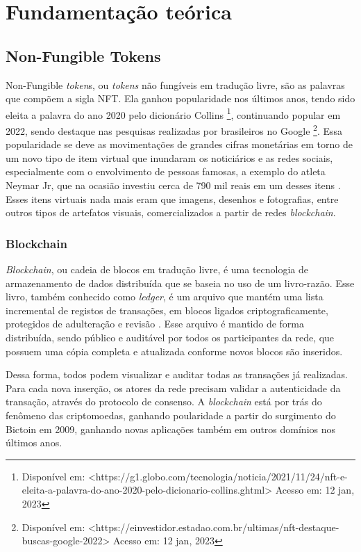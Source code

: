 \chapter{Fundamentação teórica}
\label{cap:fundamentacao-teorica}

\section{Non-Fungible Tokens}
\label{sec:non-fungible tokens}

Non-Fungible \textit{token}s, ou \textit{tokens} não fungíveis em tradução livre, são as palavras que compõem a sigla NFT. Ela ganhou popularidade nos últimos anos, tendo sido eleita a palavra do ano 2020 pelo dicionário Collins \footnote{Disponível em: <https://g1.globo.com/tecnologia/noticia/2021/11/24/nft-e-eleita-a-palavra-do-ano-2020-pelo-dicionario-collins.ghtml> Acesso em: 12 jan, 2023}, continuando popular em 2022, sendo destaque nas pesquisas realizadas por brasileiros no Google \footnote{Disponível em: <https://einvestidor.estadao.com.br/ultimas/nft-destaque-buscas-google-2022> Acesso em: 12 jan, 2023}. Essa popularidade se deve as movimentações de grandes cifras monetárias em torno de um novo tipo de item virtual que inundaram os noticiários e as redes sociais, especialmente com o envolvimento de pessoas famosas, a exemplo do atleta Neymar Jr, que na ocasião investiu cerca de 790 mil reais em um desses itens \cite{Andrade}. Esses itens virtuais nada mais eram que imagens, desenhos e fotografias, entre outros tipos de artefatos visuais, comercializados a partir de redes \textit{\textit{blockchain}}.

\subsection{Blockchain}
\label{subsec: blockchains e criptomoedas}

\textit{Blockchain}, ou cadeia de blocos em tradução livre, é uma tecnologia de armazenamento de dados distribuída que se baseia no uso de um livro-razão. Esse livro, também conhecido como \textit{ledger}, é um arquivo que mantém uma lista incremental de registos de transações, em blocos ligados criptograficamente, protegidos de adulteração e revisão \cite{Voshmgir, Lyra}. Esse arquivo é mantido de forma distribuída, sendo público e auditável por todos os participantes da rede, que possuem uma cópia completa e atualizada conforme novos blocos são inseridos. 

Dessa forma, todos podem visualizar e auditar todas as transações já realizadas. Para cada nova inserção, os atores da rede precisam validar a autenticidade da transação, através do protocolo de consenso. A \textit{blockchain} está por trás do fenômeno das criptomoedas, ganhando poularidade a partir do surgimento do Bictoin em 2009, ganhando novas aplicações também em outros domínios nos últimos anos.

